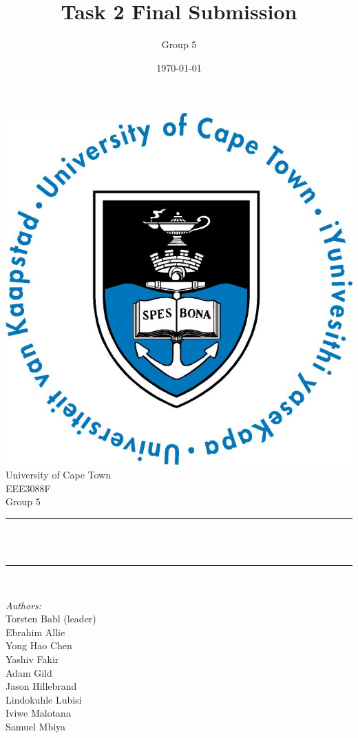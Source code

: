 \documentclass[12pt]{article}
\title{Task 2 Final Submission}								%
\author{Group 5}								%
\date{\today}											%
\makeatletter
\let\thetitle\@title
\makeatother
\begin{document}

\begin{titlepage}
	\centering
    \vspace*{0.5 cm}
    \includegraphics[scale = 0.75]{UCT.jpg}\\[1.0 cm]	%
    \LARGE University of Cape Town\\[1.0 cm]	%
	\Large EEE3088F\\				%
	\large Group 5\\				%
	\rule{\linewidth}{0.2 mm} \\[0.4 cm]
	{ \huge \bfseries \thetitle}\\
	\rule{\linewidth}{0.2 mm} \\[0.5 cm]
	
	\begin{minipage}{0.4\textwidth}
		\begin{flushleft} \large
			\emph{Authors:}\\
      Torsten Babl (leader)\\
      Ebrahim Allie\\
      Yong Hao Chen\\
      Yashiv Fakir\\
      Adam Gild\\
      Jason Hillebrand\\
      Lindokuhle Lubisi\\
      Iviwe Malotana\\
      Samuel Mbiya
      

\end{flushleft}
\end{minipage}
\end{titlepage}
\end{document}
